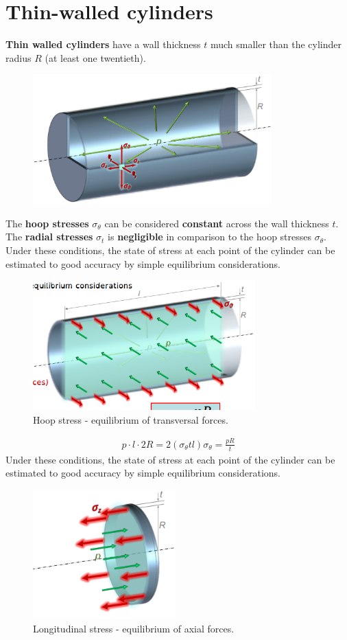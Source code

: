 \documentclass[class=report, crop=false, 12pt,a4paper]{standalone}
\begin{document}
\section{Thin-walled cylinders}
\textbf{Thin walled cylinders} have a wall thickness $t$ much smaller than the cylinder radius $R$ (at least one twentieth).
\begin{figure}[H]
    \centering
    \includegraphics[height = 5cm]{../img/diagram102.png}
    \caption{}
\end{figure}
The \textbf{hoop stresses} $\sigma_{\theta}$ can be considered \textbf{constant} across the wall thickness $t$. The \textbf{radial stresses} $\sigma_t$ is \textbf{negligible} in comparison to the hoop stresses $\sigma_{\theta}$. Under these conditions, the state of stress at each point of the cylinder can be estimated to good accuracy by simple equilibrium considerations. 
\begin{figure}[H]
    \centering
    \includegraphics[height = 5cm]{../img/diagram103.png}
    \caption{Hoop stress - equilibrium of transversal forces.}
\end{figure}
\begin{gather}
    p\cdot l \cdot 2R = 2 \left(\sigma_{\theta} t l\right)
    \sigma_{\theta} = \frac{p R}{t}
\end{gather}
Under these conditions, the state of stress at each point of the cylinder can be estimated to good accuracy by simple equilibrium considerations. 
\begin{figure}[H]
    \centering
    \includegraphics[height = 5cm]{../img/diagram104.png}
    \caption{Longitudinal stress - equilibrium of axial forces.}
\end{figure}
\end{document}
